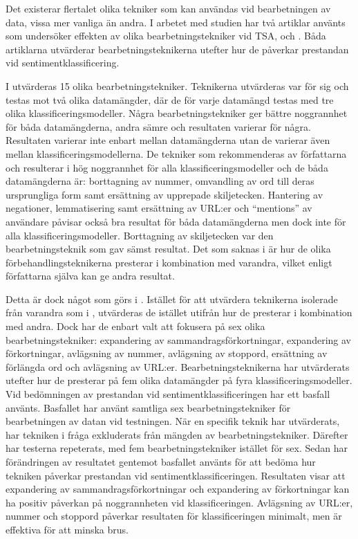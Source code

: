 \documentclass{kaumasters} %
\begin{document}
Det existerar flertalet olika tekniker som kan användas vid bearbetningen av data, vissa mer vanliga än andra. I arbetet med studien har två artiklar använts som undersöker effekten av olika bearbetningstekniker vid TSA, \cite{effrosynidis2017comparison} och \cite{7862202}. Båda artiklarna utvärderar bearbetningsteknikerna utefter hur de påverkar prestandan vid sentimentklassificering.

I \cite{effrosynidis2017comparison} utvärderas 15 olika bearbetningstekniker. Teknikerna utvärderas var för sig och testas mot två olika datamängder, där de för varje datamängd testas med tre olika klassificeringsmodeller.  Några bearbetningstekniker ger bättre noggrannhet för båda datamängderna, andra sämre och resultaten varierar för några. Resultaten varierar inte enbart mellan datamängderna utan de varierar även mellan klassificeringsmodellerna. De tekniker som rekommenderas av författarna och resulterar i hög noggrannhet för alla klassificeringsmodeller och de båda datamängderna är: borttagning av nummer, omvandling av ord till deras ursprungliga form samt ersättning av upprepade skiljetecken. Hantering av negationer, lemmatisering samt ersättning av URL:er och “mentions” av användare påvisar också bra resultat för båda datamängderna men dock inte för alla klassificeringsmodeller. Borttagning av skiljetecken var den bearbetningsteknik som gav sämst resultat. Det som saknas i \cite{effrosynidis2017comparison} är hur de olika förbehandlingsteknikerna presterar i kombination med varandra, vilket enligt författarna själva kan ge andra resultat.

Detta är dock något som görs i \cite{7862202}. Istället för att utvärdera teknikerna isolerade från varandra som i \cite{effrosynidis2017comparison}, utvärderas de istället utifrån hur de presterar i kombination med andra. Dock har de enbart valt att fokusera på sex olika bearbetningstekniker: expandering av sammandragsförkortningar, expandering av förkortningar, avlägsning av nummer, avlägsning av stoppord, ersättning av förlängda ord och avlägsning av URL:er. Bearbetningsteknikerna har utvärderats utefter hur de presterar på fem olika datamängder på fyra klassificeringsmodeller. Vid bedömningen av prestandan vid sentimentklassificeringen har ett basfall använts. Basfallet har använt samtliga sex bearbetningstekniker för bearbetningen av datan vid testningen. När en specifik teknik har utvärderats, har tekniken i fråga exkluderats från mängden av bearbetningstekniker. Därefter har testerna repeterats, med fem bearbetningstekniker istället för sex. Sedan har förändringen av resultatet gentemot basfallet använts för att bedöma hur tekniken påverkar prestandan vid sentimentklassificeringen. Resultaten visar att expandering av sammandragsförkortningar och expandering av förkortningar kan ha positiv påverkan på noggrannheten vid klassificeringen. Avlägsning av URL:er, nummer och stoppord påverkar resultaten för klassificeringen minimalt, men är effektiva för att minska brus. 
\end{document}
